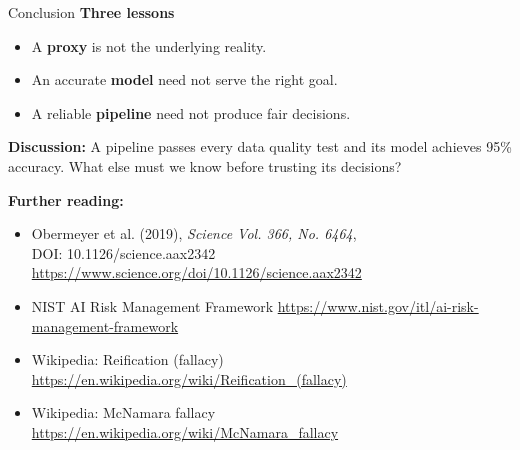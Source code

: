 \documentclass[aspectratio=43,10pt]{beamer}
\begin{document}
\begin{frame}{Conclusion}
\textbf{Three lessons}
\begin{itemize}
  \item A \textbf{proxy} is not the underlying reality.
  \item An accurate \textbf{model} need not serve the right goal.
  \item A reliable \textbf{pipeline} need not produce fair decisions.
\end{itemize}

\medskip
\textbf{Discussion:}
A pipeline passes every data quality test and its model
achieves 95\% accuracy. What else must we know before
trusting its decisions?

{\footnotesize
\medskip
\textbf{Further reading:}
\begin{itemize}
  \item Obermeyer et al. (2019), \emph{Science Vol. 366, No. 6464},\\DOI: 10.1126/science.aax2342 \url{https://www.science.org/doi/10.1126/science.aax2342}
  \item NIST AI Risk Management Framework \url{https://www.nist.gov/itl/ai-risk-management-framework}
  \item Wikipedia: Reification (fallacy) \url{https://en.wikipedia.org/wiki/Reification_(fallacy)}\\
  \item Wikipedia: McNamara fallacy \url{https://en.wikipedia.org/wiki/McNamara_fallacy}
\end{itemize}
}
\end{frame}
\end{document}
